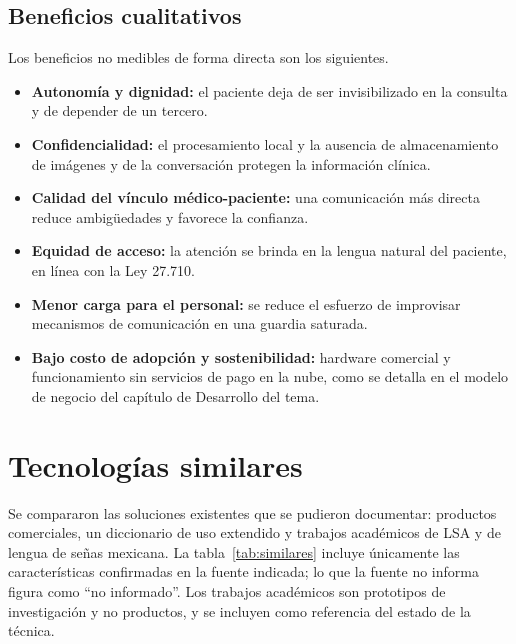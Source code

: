 \subsection{Beneficios cualitativos}

Los beneficios no medibles de forma directa son los siguientes.
\begin{itemize}
  \item \textbf{Autonomía y dignidad:} el paciente deja de ser invisibilizado en la consulta y de depender de un tercero.
  \item \textbf{Confidencialidad:} el procesamiento local y la ausencia de almacenamiento de imágenes y de la conversación protegen la información clínica.
  \item \textbf{Calidad del vínculo médico-paciente:} una comunicación más directa reduce ambigüedades y favorece la confianza.
  \item \textbf{Equidad de acceso:} la atención se brinda en la lengua natural del paciente, en línea con la Ley 27.710.
  \item \textbf{Menor carga para el personal:} se reduce el esfuerzo de improvisar mecanismos de comunicación en una guardia saturada.
  \item \textbf{Bajo costo de adopción y sostenibilidad:} hardware comercial y funcionamiento sin servicios de pago en la nube, como se detalla en el modelo de negocio del capítulo de Desarrollo del tema.
\end{itemize}

\section{Tecnologías similares}\label{sec:similares}

Se compararon las soluciones existentes que se pudieron documentar: productos comerciales, un diccionario de uso extendido y trabajos académicos de LSA y de lengua de señas mexicana. La tabla~\ref{tab:similares} incluye únicamente las características confirmadas en la fuente indicada; lo que la fuente no informa figura como ``no informado''. Los trabajos académicos son prototipos de investigación y no productos, y se incluyen como referencia del estado de la técnica.

